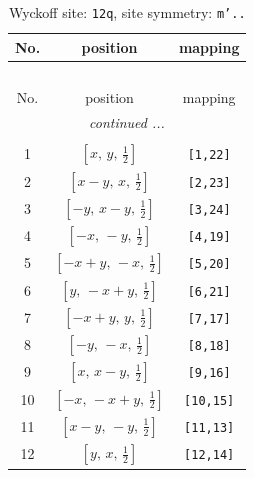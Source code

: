 \documentclass[fleqn,8pt]{jsarticle}
\begin{document}
\begin{longtable}{ccc}
\caption{Wyckoff site: {\tt 12q}, site symmetry: {\tt m'..}}
 \\
 \hline \hline
No. & position & mapping \\ \hline \endfirsthead

\multicolumn{2}{l}{\tablename\ \thetable{}} \\
 \hline \hline
No. & position & mapping \\ \hline \endhead

 \hline \hline
\multicolumn{2}{r}{\footnotesize\it continued ...} \\ \endfoot

 \hline \hline
\multicolumn{2}{r}{} \\ \endlastfoot

1 & $\left[ x,\, y,\, \frac{1}{2} \right]$ & {\tt [1,22]} \\ \hline
2 & $\left[ x - y,\, x,\, \frac{1}{2} \right]$ & {\tt [2,23]} \\ \hline
3 & $\left[ - y,\, x - y,\, \frac{1}{2} \right]$ & {\tt [3,24]} \\ \hline
4 & $\left[ - x,\, - y,\, \frac{1}{2} \right]$ & {\tt [4,19]} \\ \hline
5 & $\left[ - x + y,\, - x,\, \frac{1}{2} \right]$ & {\tt [5,20]} \\ \hline
6 & $\left[ y,\, - x + y,\, \frac{1}{2} \right]$ & {\tt [6,21]} \\ \hline
7 & $\left[ - x + y,\, y,\, \frac{1}{2} \right]$ & {\tt [7,17]} \\ \hline
8 & $\left[ - y,\, - x,\, \frac{1}{2} \right]$ & {\tt [8,18]} \\ \hline
9 & $\left[ x,\, x - y,\, \frac{1}{2} \right]$ & {\tt [9,16]} \\ \hline
10 & $\left[ - x,\, - x + y,\, \frac{1}{2} \right]$ & {\tt [10,15]} \\ \hline
11 & $\left[ x - y,\, - y,\, \frac{1}{2} \right]$ & {\tt [11,13]} \\ \hline
12 & $\left[ y,\, x,\, \frac{1}{2} \right]$ & {\tt [12,14]} \\
\end{longtable}
\renewcommand{\arraystretch}{1.2}
\end{document}
